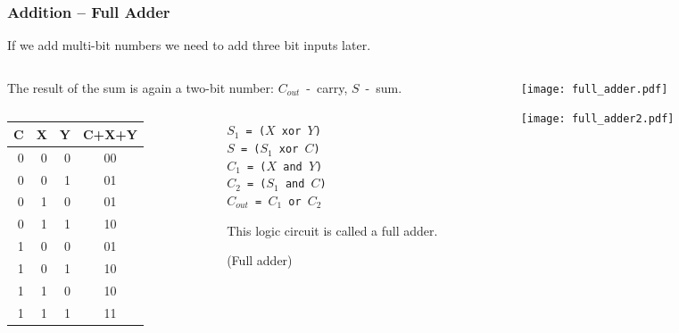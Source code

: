 \documentclass{beamer}
\begin{document}
\begin{frame}
\frametitle{Addition -- Full Adder}

If we add multi-bit numbers we need to add three bit inputs later.

\begin{columns}
\begin{column}{0.6\textwidth}
The result of the sum is again a two-bit number: $C_{out}$~-~carry, $S$~-~sum.

\begin{columns}
\begin{column}{0.55\textwidth}

\bigskip

\begin{tabular}{|r|r|r|c|}\hline
C & X & Y & C+X+Y\\ \hline
0 & 0 & 0 & 00\\ \hline
0 & 0 & 1 & 01\\ \hline
0 & 1 & 0 & 01\\ \hline
0 & 1 & 1 & 10\\ \hline
1 & 0 & 0 & 01\\ \hline
1 & 0 & 1 & 10\\ \hline
1 & 1 & 0 & 10\\ \hline
1 & 1 & 1 & 11\\ \hline
\end{tabular}

\end{column}
\begin{column}{0.45\textwidth}

\texttt{$S_1$ = ($X$ xor $Y$)}\\
\texttt{$S$ = ($S_1$ xor $C$)}\\
\texttt{$C_1$ = ($X$ and $Y$)}\\
\texttt{$C_2$ = ($S_1$ and $C$)}\\
\texttt{$C_{out}$ = $C_1$ or $C_2$}

\bigskip

This logic circuit is called a full adder.

(Full adder)
\end{column}
\end{columns}

\end{column}
\begin{column}{0.4\textwidth}  

\begin{center}
   \texttt{[image: full\_adder.pdf]}
\end{center}


\begin{center}
   \texttt{[image: full\_adder2.pdf]}
\end{center}

\end{column}
\end{columns}


\end{frame}
\end{document}
